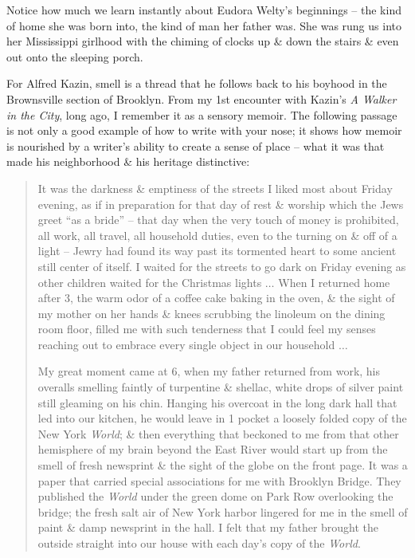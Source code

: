 \documentclass{article}
\begin{document}
Notice how much we learn instantly about Eudora Welty's beginnings -- the kind of home she was born into, the kind of man her father was. She was rung us into her Mississippi girlhood with the chiming of clocks up \& down the stairs \& even out onto the sleeping porch.

For Alfred Kazin, smell is a thread that he follows back to his boyhood in the Brownsville section of Brooklyn. From my 1st encounter with Kazin's \textit{A Walker in the City}, long ago, I remember it as a sensory memoir. The following passage is not only a good example of how to write with your nose; it shows how memoir is nourished by a writer's ability to create a sense of place -- what it was that made his neighborhood \& his heritage distinctive:
\begin{quotation}
	It was the darkness \& emptiness of the streets I liked most about Friday evening, as if in preparation for that day of rest \& worship which the Jews greet ``as a bride'' -- that day when the very touch of money is prohibited, all work, all travel, all household duties, even to the turning on \& off of a light -- Jewry had found its way past its tormented heart to some ancient still center of itself. I waited for the streets to go dark on Friday evening as other children waited for the Christmas lights $\ldots$ When I returned home after 3, the warm odor of a coffee cake baking in the oven, \& the sight of my mother on her hands \& knees scrubbing the linoleum on the dining room floor, filled me with such tenderness that I could feel my senses reaching out to embrace every single object in our household $\ldots$
	
	My great moment came at 6, when my father returned from work, his overalls smelling faintly of turpentine \& shellac, white drops of silver paint still gleaming on his chin. Hanging his overcoat in the long dark hall that led into our kitchen, he would leave in 1 pocket a loosely folded copy of the New York \textit{World}; \& then everything that beckoned to me from that other hemisphere of my brain beyond the East River would start up from the smell of fresh newsprint \& the sight of the globe on the front page. It was a paper that carried special associations for me with Brooklyn Bridge. They published the \textit{World} under the green dome on Park Row overlooking the bridge; the fresh salt air of New York harbor lingered for me in the smell of paint \& damp newsprint in the hall. I felt that my father brought the outside straight into our house with each day's copy of the \textit{World}.
\end{quotation}
\end{document}
